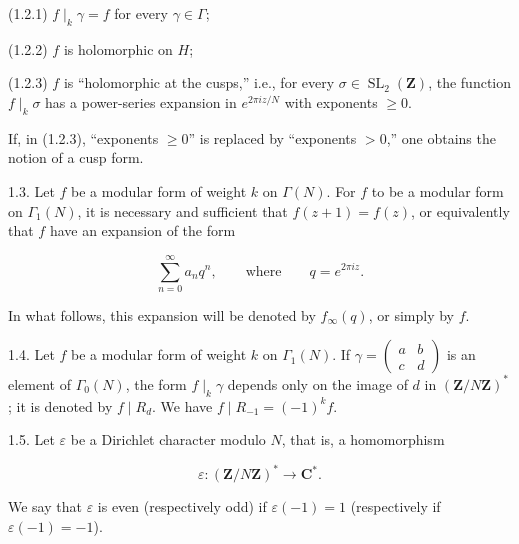 \documentclass[10pt,oneside]{article}
\begin{document}
(1.2.1) \(f\mid_k\gamma=f\) for every \(\gamma\in\Gamma\);\par

(1.2.2) \(f\) is holomorphic on \(H\);\par

(1.2.3) \(f\) is “holomorphic at the cusps,” i.e., for every \(\sigma\in\operatorname{SL}_2(\mathbf{Z})\), the function \(f\mid_k\sigma\) has a power-series expansion in \(e^{2\pi iz/N}\) with exponents \(\geq 0\).\par

If, in (1.2.3), “exponents \(\geq 0\)” is replaced by “exponents \(>0\),” one obtains the notion of a cusp form.\par

1.3. Let \(f\) be a modular form of weight \(k\) on \(\Gamma(N)\). For \(f\) to be a modular form on \(\Gamma_1(N)\), it is necessary and sufficient that \(f(z+1)=f(z)\), or equivalently that \(f\) have an expansion of the form\par

\begin{equation*}
\sum_{n=0}^{\infty}a_nq^n,
\qquad\text{where}\qquad q=e^{2\pi iz}.
\end{equation*}

In what follows, this expansion will be denoted by \(f_\infty(q)\), or simply by \(f\).\par

1.4. Let \(f\) be a modular form of weight \(k\) on \(\Gamma_1(N)\). If \(\gamma=\begin{pmatrix}a&b\\c&d\end{pmatrix}\) is an element of \(\Gamma_0(N)\), the form \(f\mid_k\gamma\) depends only on the image of \(d\) in \((\mathbf{Z}/N\mathbf{Z})^*\); it is denoted by \(f\mid R_d\). We have \(f\mid R_{-1}=(-1)^kf\).\par

1.5. Let \(\varepsilon\) be a Dirichlet character modulo \(N\), that is, a homomorphism\par

\begin{equation*}
\varepsilon:(\mathbf{Z}/N\mathbf{Z})^*\longrightarrow\mathbf{C}^*.
\end{equation*}

We say that \(\varepsilon\) is even (respectively odd) if \(\varepsilon(-1)=1\) (respectively if \(\varepsilon(-1)=-1\)).\par

\newpage
\end{document}
